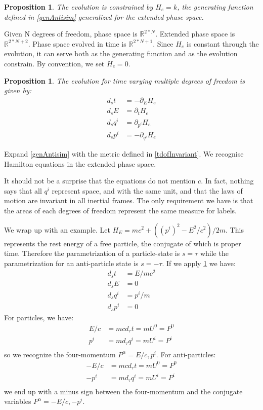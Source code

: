 \documentclass[twocolumn,floatfix,nofootinbib]{revtex4}   %
\theoremstyle{theorem}
\newtheorem{prop}[thm]{Proposition}
\theoremstyle{definition}
\begin{document}
\begin{prop}\label{tdofConstrain}
The evolution is constrained by $H_{e}=k$, the generating function defined in \ref{genAntisim} generalized for the extended phase space.
\end{prop}

Given N degrees of freedom, phase space is $\mathbb{R}^{2*N}$. Extended phase space is $\mathbb{R}^{2*N + 2}$. Phase space evolved in time is $\mathbb{R}^{2*N + 1}$. Since $H_{e}$ is constant through the evolution, it can serve both as the generating function and as the evolution constrain. By convention, we set $H_{e}=0$.

\begin{prop}\label{tdofHam}
The evolution for time varying multiple degrees of freedom is given by:
\begin{align*}
d_{s}t &= - \partial_{E} H_{e} \\
d_{s}E &= \partial_{t} H_{e} \\
d_{s}q^i &= \partial_{p^i} H_{e} \\
d_{s}p^i &= - \partial_{q^i} H_{e}
\end{align*}
\end{prop}

Expand \ref{genAntisim} with the metric defined in \ref{tdofInvariant}. We recognise Hamilton equations in the extended phase space.

It should not be a surprise that the equations do not mention $c$. In fact, nothing says that all $q^i$ represent space, and with the same unit, and that the laws of motion are invariant in all inertial frames. The only requirement we have is that the areas of each degrees of freedom represent the same measure for labels.

We wrap up with an example. Let $H_{E}= mc^2 + ((p^i)^2 - E^2/c^2) / 2m$. This represents the rest energy of a free particle, the conjugate of which is proper time. Therefore the parametrization of a particle-state is $s=\tau$ while the parametrization for an anti-particle state is $s=-\tau$. If we apply \ref{tdofHam} we have:
\begin{align*}
d_{s}t &= E / mc^2 \\
d_{s}E &= 0 \\
d_{s}q^i &= p^i / m \\
d_{s}p^i &= 0
\end{align*}
For particles, we have:
\begin{align*}
E / c &= m c d_{\tau}t = m U^0 = P^0 \\
p^i &= m d_{\tau}q^i = m U^i = P^i \\
\end{align*}
so we recognize the four-momentum $P^\alpha = {E/c, p^i}$. For anti-particles:
\begin{align*}
- E / c &= m c d_{\tau}t = m U^0 = P^0 \\
- p^i &= m d_{\tau}q^i = m U^i = P^i \\
\end{align*}
we end up with a minus sign between the four-momentum and the conjugate variables $P^\alpha = {-E/c, -p^i}$.
\end{document}
